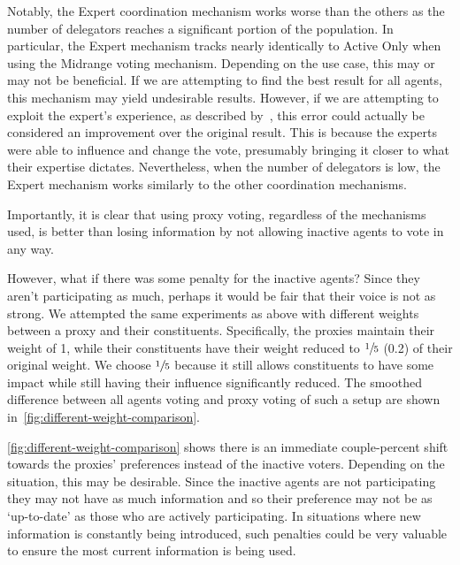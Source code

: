 Notably, the Expert coordination mechanism works worse than the others as the number
of delegators reaches a significant portion of the population.
In particular, the Expert mechanism tracks nearly identically to Active Only when
using the Midrange voting mechanism.
Depending on the use case, this may or may not be beneficial.
If we are attempting to find the best result for all agents, this mechanism may yield
undesirable results.
However, if we are attempting to exploit the expert's experience, as described
by~\cite{Miller1969}, this error could actually be considered an improvement over
the original result.
This is because the experts were able to influence and change the vote, presumably
bringing it closer to what their expertise dictates.
Nevertheless, when the number of delegators is low, the Expert mechanism works
similarly to the other coordination mechanisms.

Importantly, it is clear that using proxy voting, regardless of the mechanisms used,
is better than losing information by not allowing inactive agents to vote in any way.

However, what if there was some penalty for the inactive agents?
Since they aren't participating as much, perhaps it would be fair that their voice is
not as strong.
We attempted the same experiments as above with different weights between a proxy and
their constituents.
Specifically, the proxies maintain their weight of 1, while their constituents have
their weight reduced to $\sfrac{1}{5}$ (0.2) of their original weight.
We choose $\sfrac{1}{5}$ because it still allows constituents to have some impact
while still having their influence significantly reduced.
The smoothed difference between all agents voting and proxy voting of such a setup are
shown in~\autoref{fig:different-weight-comparison}.

\autoref{fig:different-weight-comparison}
shows there is an immediate couple-percent shift towards the proxies' preferences
instead of the inactive voters.
Depending on the situation, this may be desirable.
Since the inactive agents are not participating they may not have as much information
and so their preference may not be as `up-to-date' as those who are actively
participating.
In situations where new information is constantly being introduced, such penalties
could be very valuable to ensure the most current information is being used.

